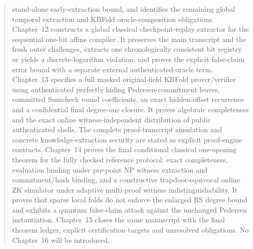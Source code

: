 \documentclass[11pt]{article}
\numberwithin{equation}{section}
\theoremstyle{definition}
\theoremstyle{remark}
\begin{document}
\begin{abstract}
stand-alone early-extraction bound, and identifies the remaining global temporal extraction and KBFold oracle-composition obligations. Chapter~12 constructs a global classical checkpoint-replay extractor for the sequential one-bit affine compiler. It preserves the main transcript and the fresh outer challenges, extracts one chronologically consistent bit registry or yields a discrete-logarithm violation, and proves the explicit false-claim error bound with a separate external authenticated-oracle term. Chapter~13 specifies a full masked original-field KBFold prover/verifier using authenticated perfectly hiding Pedersen-commitment leaves, committed Sumcheck round coefficients, an exact hidden-offset recurrence and a confidential final degree-one closure. It proves algebraic completeness and the exact online witness-independent distribution of public authenticated shells. The complete proof-transcript simulation and concrete knowledge-extraction security are stated as explicit proof-engine contracts. Chapter~14 proves the final conditional classical one-opening theorem for the fully checked reference protocol: exact completeness, evaluation binding under pre-point NP witness extraction and commitment/hash binding, and a constructive trapdoor-equivocal online ZK simulator under adaptive multi-proof witness indistinguishability. It proves that sparse local folds do not enforce the enlarged RS degree bound and exhibits a quantum false-claim attack against the unchanged Pedersen instantiation. Chapter~15 closes the same manuscript with the final theorem ledger, explicit certification targets and unresolved obligations. No Chapter~16 will be introduced.
\end{abstract}
\tableofcontents










\clearpage

\clearpage

\clearpage

\clearpage

\clearpage

\begingroup\sloppy\printbibliography\endgroup
\end{document}
